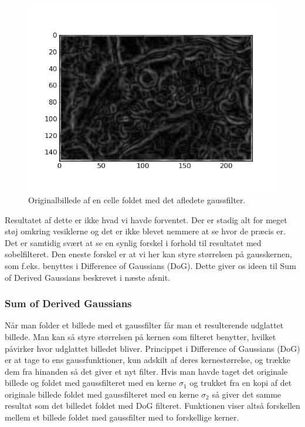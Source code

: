 \begin{figure}[H]
	\centering
	\includegraphics[scale=0.8]{files/premethod/img/gauss_derived_cell2.png}
	\caption{Originalbillede af en celle foldet med det afledete gaussfilter.\label{fig:premethod_gaussCell}}
\end{figure}

Resultatet af dette er ikke hvad vi havde forventet. Der er stadig alt for meget støj omkring vesiklerne og det er ikke blevet nemmere at se hvor de præcis er. Det er samtidig svært at se en synlig forskel i forhold til resultatet med sobelfilteret. Den eneste forskel er at vi her kan styre størrelsen på gausskernen, som f.eks. benyttes i Difference of Gaussians (DoG). Dette giver os ideen til Sum of Derived Gaussians beskrevet i næste afsnit.

\subsubsection{Sum of Derived Gaussians}
Når man folder et billede med et gaussfilter får man et resulterende udglattet billede. Man kan så styre størrelsen på kernen som filteret benytter, hvilket påvirker hvor udglattet billedet bliver. Princippet i Difference of Gaussians (DoG) er at tage to ens gaussfunktioner, kun adskilt af deres kernestørrelse, og trække dem fra hinanden så det giver et nyt filter. Hvis man havde taget det originale billede og foldet med gaussfilteret med en kerne $\sigma_1$ og trukket fra en kopi af det originale billede foldet med gaussfilteret med en kerne $\sigma_2$ så giver det samme resultat som det billedet foldet med DoG filteret. Funktionen viser altså forskellen mellem et billede foldet med gaussfilter med to forskellige kerner. 

